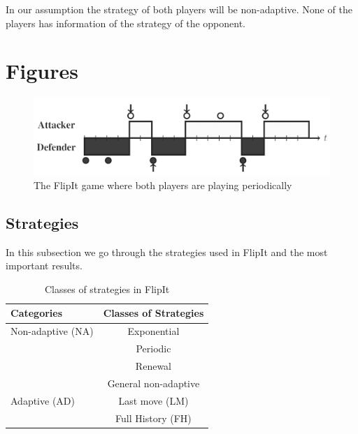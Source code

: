 In our assumption the strategy of both players will be non-adaptive. None of the players has information of the strategy of the opponent. 



\section{Figures}
\begin{figure}[hbtp]
\centering
\includegraphics[scale=0.25]{Images/FlipItDefault.jpg}
\caption{The FlipIt game where both players are playing periodically}
\label{fig:FLipItDefault}
\end{figure}

\subsection{Strategies}
 
 In this subsection we go through the strategies used in FlipIt and the most important results. 
 \begin{table}
 \centering
 \begin{tabular}{ l | c  }
  \textbf{Categories} & \textbf{Classes of Strategies} \\
  \hline Non-adaptive (NA) & Exponential \\
  & Periodic \\
  & Renewal \\
  & General non-adaptive \\
  \hline Adaptive (AD) & Last move (LM) \\
  & Full History (FH) \\  
\end{tabular}
 \caption{Classes of strategies in FlipIt}
 \label{table:Strategies}
 \end{table}

